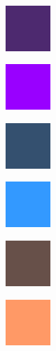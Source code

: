 \begin{figure}[h]
\begin{subfigure}{0.1075\textwidth}
	\end{subfigure} \\
	\begin{subfigure}{0.1075\textwidth}
		\centering
		\includegraphics[scale=1, frame]{gui-imgs/R153G0B255A64}
	\end{subfigure}
	\begin{subfigure}{0.1075\textwidth}
		\centering
		\includegraphics[scale=1, frame]{gui-imgs/R153G0B255A255}
	\end{subfigure}
	\begin{subfigure}{0.1075\textwidth}
		\centering
		\includegraphics[scale=1, frame]{gui-imgs/R51G153B255A64}
	\end{subfigure}
	\begin{subfigure}{0.1075\textwidth}
		\centering
		\includegraphics[scale=1, frame]{gui-imgs/R51G153B255A255}
	\end{subfigure}
	\begin{subfigure}{0.1075\textwidth}
		\centering
		\includegraphics[scale=1, frame]{gui-imgs/R255G153B102A64}
	\end{subfigure}
	\begin{subfigure}{0.1075\textwidth}
		\centering
		\includegraphics[scale=1, frame]{gui-imgs/R255G153B102A255}

\end{subfigure}
\end{figure}
